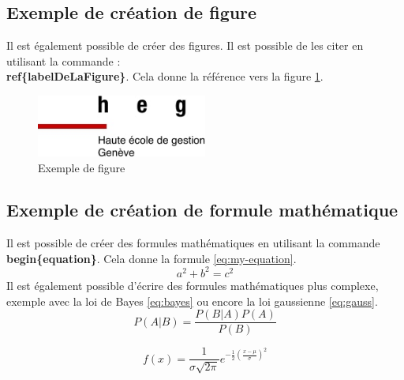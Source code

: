 \documentclass[12pt]{article}
\begin{document}
\subsection{Exemple de création de figure}

Il est également possible de créer des figures. Il est possible de les citer en utilisant la commande :
\textbf{\\ref\{labelDeLaFigure\}}.
\newline
Cela donne la référence vers la figure \ref{fig:my-figure}.

\begin{figure}[htp]
    \centering
    \includegraphics[width=0.5\textwidth]{img/logo_heg-ge.jpg}
    \caption{Exemple de figure}
    \label{fig:my-figure}
\end{figure}

\subsection{Exemple de création de formule mathématique}

Il est possible de créer des formules mathématiques en utilisant la commande \textbf{\\begin\{equation\}}.
\newline
Cela donne la formule \ref{eq:my-equation}.
\begin{equation}
    \label{eq:my-equation}
    a^2 + b^2 = c^2
\end{equation}
Il est également possible d'écrire des formules mathématiques plus complexe, exemple avec la loi de Bayes \ref{eq:bayes} ou encore la loi gaussienne \ref{eq:gauss}.
\begin{equation}
    \label{eq:bayes}
    P(A|B) = \frac{P(B|A)P(A)}{P(B)}
\end{equation}

\begin{equation}
    \label{eq:gauss}
    f(x) = \frac{1}{\sigma\sqrt{2\pi}}e^{-\frac{1}{2}\left(\frac{x-\mu}{\sigma}\right)^2}
\end{equation}
\end{document}

